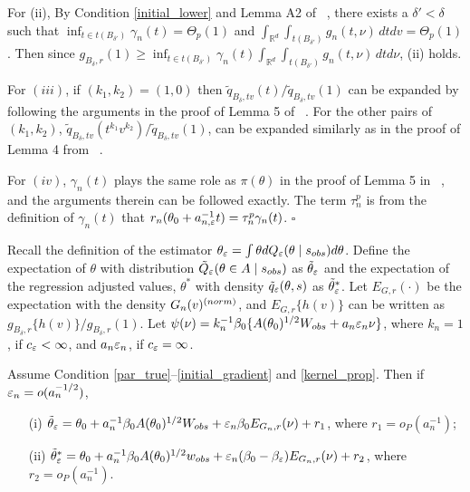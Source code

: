 	For (ii), By Condition \ref{initial_lower} and Lemma A2 of ~\cite{Li2017}, there exists a $\delta'<\delta$
	such that $\inf_{t\in t(B_{\delta'})}\gamma_{n}(t)=\Theta_{p}(1)$
	and $\int_{\mathbb{R}^{d}}\int_{t(B_{\delta'})}g_{n}(t,\nu)\,dtdv=\Theta_{p}(1)$.
	Then since $g_{B_{\delta},r}(1)\geq\inf_{t\in t(B_{\delta'})}\gamma_{n}(t)\int_{\mathbb{R}^{d}}\int_{t(B_{\delta'})}g_{n}(t,\nu)\,dtd\nu$,
	(ii) holds.
	
	For $(iii)$, if $(k_1,k_2)=(1,0)$ then $\tilde{q}_{B_{\delta},tv}(t)/\tilde{q}_{B_{\delta},tv}(1)$
	can be expanded by following the arguments in the proof of Lemma 5
	of ~\cite{Li2016}. For the other pairs of $(k_1,k_2)$, $\tilde{q}_{B_{\delta},tv}(t^{k_{1}}v^{k_{2}})/\tilde{q}_{B_{\delta},tv}(1)$,
	can be expanded similarly as in the proof of Lemma 4 from ~\cite{Li2017}.
	
	For $(iv)$, $\gamma_{n}(t)$ plays the same role as $\pi(\theta)$
	in the proof of Lemma 5 in ~\cite{Li2016}, and the arguments therein
	can be followed exactly. The term $\tau_{n}^{p}$ is from the definition
	of $\gamma_{n}(t)$ that $r_{n}(\theta_0+a_{n,\veps}^{-1}t)=\tau_{n}^{p}\gamma_{n}(t)$.
	\hfill{$\square$} 
	
	

Recall the definition of the estimator $\theta_{\veps} = \int \theta dQ_{\veps}(\theta \mid s_{obs}) d\theta$. Define the expectation of $\theta$ with distribution $\tilde{Q}_{\veps}(\theta\in A\mid s_{\rm obs})$
as $\tilde{\theta}_{\veps}$ and the expectation of the regression adjusted values, $\theta^*$ 
with density $\tilde{q}_{\veps}(\theta,s)$ as $\tilde{\theta}_{\veps}^{*}$.
Let $E_{G,r}(\cdot)$ be the expectation with the density $G_{n}(v)^{({\rm norm})}$,
and $E_{G,r}\{h(v)\}$ can be written as $g_{B_{\delta},r}\{h(v)\}/g_{B_{\delta},r}(1)$.
Let $\psi(\nu)=k_{n}^{-1}\beta_{0}\{A(\theta_{0})^{1/2}W_{\rm obs}+a_{n}\veps_{n}\nu\}$,
where $k_{n}=1$, if $c_{\veps}<\infty$, and $a_{n}\veps_{n}$,
if $c_{\veps}=\infty$. 


\begin{lemma}\label{Alemma3} Assume Condition \ref{par_true}--\ref{initial_gradient} and \ref{kernel_prop}. Then if $\veps_{n}=o(a_{n}^{-1/2})$, 
	\begin{enumerate}
		\item[(i)] $\tilde{\theta}_{\veps}=\theta_{0}+a_{n}^{-1}\beta_{0}A(\theta_{0})^{1/2}W_{\rm obs}+\veps_{n}\beta_{0}E_{G_{n},r}(\nu)+r_{1}$,
		where $r_{1}=o_{P}(a_{n}^{-1})$; 
		\item[(ii)] $\tilde{\theta}_{\veps}^{*}=\theta_{0}+a_{n}^{-1}\beta_{0}A(\theta_{0})^{1/2}w_{\rm obs}+\veps_{n}(\beta_{0}-\beta_{\veps})E_{G_{n},r}(\nu)+r_{2}$,
		where $r_{2}=o_{P}(a_{n}^{-1})$. 
	\end{enumerate}\end{lemma}

